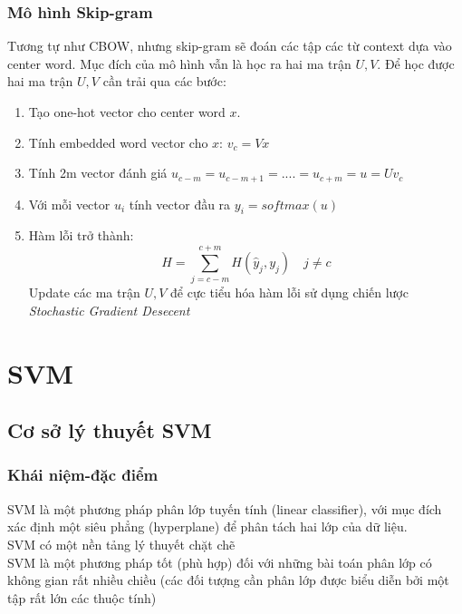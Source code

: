 \documentclass[a4paper,12pt]{report}
\begin{document}
\subsubsection{Mô hình Skip-gram}
Tương tự như CBOW, nhưng skip-gram sẽ đoán các tập các từ context dựa vào center word. Mục đích của mô hình vẫn là học ra hai ma trận $U, V$. Để học được hai ma trận $U, V$ cần trải qua các bước:
\begin{enumerate}
\item Tạo one-hot vector cho center word $x$.
\item Tính embedded word vector cho $x$: $v_c = Vx$
\item Tính 2m vector đánh giá $u_{c-m} = u_{c-m+1} = .... = u_{c+m} = u = Uv_c$
\item Với mỗi vector $u_i$ tính vector đầu ra $y_i = softmax(u)$
\item Hàm lỗi trở thành:
$$H = \sum_{j=c-m}^{c+m} H(\hat{y}_j,y_j) \quad j \neq c$$
Update các ma trận $U, V$ để cực tiểu hóa hàm lỗi sử dụng chiến lược \emph{Stochastic Gradient Desecent}


\end{enumerate} 


\section{SVM}
\subsection{Cơ sở lý thuyết SVM}
\subsubsection{Khái niệm-đặc điểm  }
SVM là một phương pháp phân lớp tuyến tính (linear
classifier), với mục đích xác định một siêu phẳng
(hyperplane) để phân tách hai lớp của dữ liệu.\\
SVM có một nền tảng lý thuyết chặt chẽ\\
SVM là một phương pháp tốt (phù hợp) đối với những bài
toán phân lớp có không gian rất nhiều chiều (các đối
tượng cần phân lớp được biểu diễn bởi một tập rất lớn
các thuộc tính)\\
\end{document}
